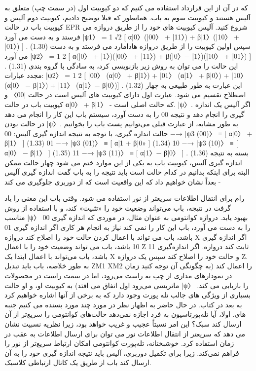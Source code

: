 \documentclass{book}
\begin{document}
که در آن از این قرارداد استفاده می کنیم که دو کیوبیت اول (در سمت چپ) متعلق به آلیس هستند و
کیوبیت سوم به باب. همانطور که قبلا توضیح دادیم، کیوبیت دوم آلیس و کیوبیت باب
در حالت EPR شروع کنید. آلیس کیوبیت های خود را از طریق دروازه می فرستد و به دست می آورد
|ψ1〉 = 1
√2
[
α|0〉(|00〉 + |11〉) + β|1〉(|10〉 + |01〉)
]
. (1.30)
سپس اولین کیوبیت را از طریق دروازه هادامارد می فرستد و به دست می آورد
|ψ2〉 = 1
2
[
α(|0〉 + |1〉)(|00〉 + |11〉) + β(|0〉− |1〉)(|10〉 + |01〉)
]
.
(1.31)
این حالت را می توان به روش زیر بازنویسی کرد، به سادگی با گروه بندی مجدد عبارات:
|ψ2〉 = 1
2
[
|00〉 (α|0〉 + β|1〉) + |01〉 (α|1〉 + β|0〉)
+ |10〉 (α|0〉 − β|1〉) + |11〉 (α|1〉− β|0〉)]
. (1.32)
این عبارت به طور طبیعی به چهار اصطلاح تقسیم می شود. عبارت اول دارای کیوبیت های آلیس است
در حالت |00〉 و کیوبیت باب در حالت α|0〉 + β|1〉 - که حالت اصلی است.
|ψ〉. اگر آلیس یک اندازه گیری را انجام دهد و نتیجه 00 را به دست آورد، سیستم باب این کار را انجام می دهد
در حالت بودن |ψ〉. به طور مشابه، از عبارت قبلی می‌توانیم پست باب را بخوانیم
حالت اندازه گیری، با توجه به نتیجه اندازه گیری آلیس:
00 −→ |ψ3 (00)〉 ≡
[
α|0〉 + β|1〉
]
(1.33)
01 −→ |ψ3 (01)〉 ≡
[
α|1 + β|0»
]
(1.34)
10 −→ |ψ3 (10)〉 ≡
[
α|0〉 − β|1〉
]
(1.35)
11 −→ |ψ3 (11)〉 ≡
[
α|1〉− β|0〉
]
. (1.36)
بسته به نتیجه اندازه گیری آلیس، کیوبیت باب به یکی از این موارد ختم می شود
چهار حالت ممکن البته برای اینکه بدانیم در کدام حالت است باید نتیجه را به باب گفت
اندازه گیری آلیس - بعداً نشان خواهیم داد که این واقعیت است که از دوربری جلوگیری می کند




رام برای انتقال اطلاعات سریعتر از نور استفاده می شود. وقتی باب این معنی را یاد گرفت
در نتیجه، باب می‌تواند وضعیت خود را «تثبیت» کند، و با استفاده از روش مناسب |ψ〉 بهبود یابد.
دروازه کوانتومی به عنوان مثال، در موردی که اندازه گیری 00 را به دست می آورد، باب این کار را نمی کند
نیاز به انجام هر کاری اگر اندازه گیری 01 باشد، باب می تواند با اعمال کردن حالت خود را اصلاح کند
دروازه X اگر اندازه گیری 10 باشد، باب می تواند وضعیت خود را با اعمال Z ثابت کند
دروازه. اگر اندازه‌گیری 11 باشد، باب می‌تواند با اعمال ابتدا یک X و حالت خود را اصلاح کند
سپس یک دروازه Z. به طور خلاصه، باب باید تبدیل ZM1 XM2 را اعمال کند (به چگونگی آن توجه کنید
زمان در نمودارهای مداری از چپ به راست می‌رود، اما در سمت راست در محصولات ماتریسی می‌رود
اول اتفاق می افتد) به کیوبیت او، و او حالت |ψ〉 را بازیابی می کند.
بسیاری از ویژگی های جالب تله پورت وجود دارد که به برخی از آنها اشاره خواهیم کرد
به بعد در کتاب. در حال حاضر به اظهار نظر در مورد چند مورد بسنده می کنیم
جنبه های. اولا، آیا تله‌پورتاسیون به فرد اجازه نمی‌دهد حالت‌های کوانتومی را سریع‌تر از آن ارسال کند
سبک؟ این امر نسبتاً عجیب و غریب خواهد بود، زیرا نظریه نسبیت نشان می دهد که سریعتر
از انتقال اطلاعات نور می توان برای ارسال اطلاعات به عقب در زمان استفاده کرد.
خوشبختانه، تله‌پورت کوانتومی امکان ارتباط سریع‌تر از نور را فراهم نمی‌کند.
زیرا برای تکمیل دوربری، آلیس باید نتیجه اندازه گیری خود را به آن ارسال کند
باب از طریق یک کانال ارتباطی کلاسیک.
\end{document}
